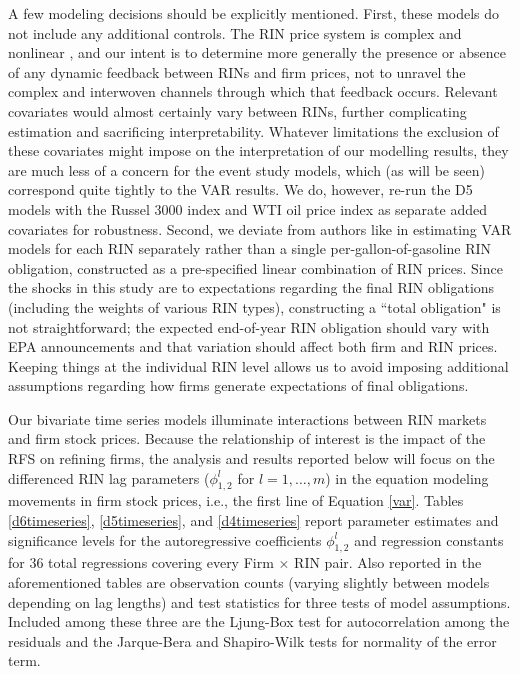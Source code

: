 \documentclass[11pt]{article}
\begin{document}
A few modeling decisions should be explicitly mentioned. First, these models do not include any additional controls. The RIN price system is complex and nonlinear \citep{Serra2011}, and our intent is to determine more generally the presence or absence of any dynamic feedback between RINs and firm prices, not to unravel the complex and interwoven channels through which that feedback occurs. Relevant covariates would almost certainly vary between RINs, further complicating estimation and sacrificing interpretability. Whatever limitations the exclusion of these covariates might impose on the interpretation of our modelling results, they are much less of a concern for the event study models, which (as will be seen) correspond quite tightly to the VAR results. We do, however, re-run the D5 models with the Russel 3000 index and WTI oil price index as separate added covariates for robustness. Second, we deviate from authors like \cite{Knittel2017} in estimating VAR models for each RIN separately rather than a single per-gallon-of-gasoline RIN obligation, constructed as a pre-specified linear combination of RIN prices. Since the shocks in this study are to expectations regarding the final RIN obligations (including the weights of various RIN types), constructing a ``total obligation" is not straightforward; the expected end-of-year RIN obligation should vary with EPA announcements and that variation should affect both firm and RIN prices. Keeping things at the individual RIN level allows us to avoid imposing additional assumptions regarding how firms generate expectations of final obligations.

Our bivariate time series models illuminate interactions between RIN markets and firm stock prices. Because the relationship of interest is the impact of the RFS on refining firms, the analysis and results reported below will focus on the differenced RIN lag parameters ($\phi_{1,2}^l$ for $l=1,\dots,m$) in the equation modeling movements in firm stock prices, i.e., the first line of Equation \ref{var}. Tables \ref{d6timeseries}, \ref{d5timeseries}, and \ref{d4timeseries} report parameter estimates and significance levels for the autoregressive coefficients $\phi_{1,2}^l$ and regression constants for 36 total regressions covering every Firm $\times$ RIN pair. Also reported in the aforementioned tables are observation counts (varying slightly between models depending on lag lengths) and test statistics for three tests of model assumptions. Included among these three are the Ljung-Box test for autocorrelation among the residuals and the Jarque-Bera and Shapiro-Wilk tests for normality of the error term.
\end{document}
